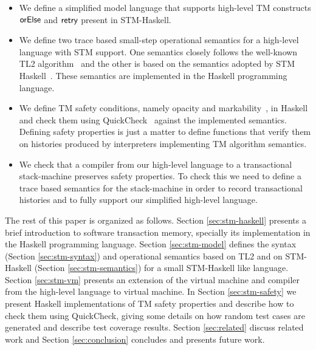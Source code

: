 \documentclass[sigplan, anonymous, review]{acmart}
\theoremstyle{definition}
\newcommand{\F}[1]{\green{\mathsf{#1}}}
\begin{document}
\begin{itemize}
   \item We define a simplified model language that supports high-level TM constructs 
         \ensuremath{\F{orElse}} and \ensuremath{\F{retry}} present in STM-Haskell.
   \item We define two trace based small-step operational semantics for a high-level 
         language with STM support. One semantics closely follows the well-known TL2
         algorithm~\cite{Dice06} and the other is based on the semantics adopted by STM Haskell~\cite{Harris05}.
         These semantics are implemented in the Haskell programming language.
   \item We define TM safety conditions, namely opacity and markability~\cite{Guerraoui2008,Doherty2009,Imbs2009,LesaniP14},
         in Haskell and check them using QuickCheck~\cite{Claessen00} against the implemented semantics. Defining safety properties
         is just a matter to define functions that verify them on histories produced by interpreters implementing TM algorithm
         semantics.
    \item We check that a compiler from our high-level language to a transactional
          stack-machine preserves safety properties.
          To check this we need to define a trace based semantics for the stack-machine 
          in order to record transactional histories and to fully support our
          simplified high-level language.
\end{itemize}

The rest of this paper is organized as follows. Section \ref{sec:stm-haskell} presents a brief introduction
to software transaction memory, specially its implementation in the Haskell programming language. Section \ref{sec:stm-model}
defines the syntax (Section \ref{sec:stm-syntax}) and operational semantics
based on TL2 and on STM-Haskell (Section \ref{sec:stm-semantics}) for a small STM-Haskell like language.
Section \ref{sec:stm-vm} presents an extension of the
virtual machine and compiler from the high-level language to virtual machine. In Section \ref{sec:stm-safety}
we present Haskell implementations of TM safety properties and describe how to check them using
QuickCheck, giving some details on how random test cases are generated and describe test coverage results.
Section \ref{sec:related} discuss related work and Section \ref{sec:conclusion} concludes and
presents future work.

\end{document}
